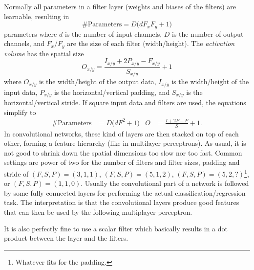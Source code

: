 	Normally all parameters in a filter layer (weights and biases of the filters) are learnable, resulting in
	\begin{equation}
		\text{\#Parameters} = D \big( d F_x F_y + 1 \big)
	\end{equation}
	parameters where \(d\) is the number of input channels, \(D\) is the number of output channels, and \(F_x\)/\(F_y\) are the size of each filter (width/height). The \emph{activation volume} has the spatial size
	\begin{equation}
		O_{x/y} = \frac{I_{x/y} + 2 P_{x/y} - F_{x/y}}{S_{x/y}} + 1
	\end{equation}
	where \(O_{x/y}\) is the width/height of the output data, \(I_{x/y}\) is the width/height of the input data, \(P_{x/y}\) is the horizontal/vertical padding, and \(S_{x/y}\) is the horizontal/vertical stride. If square input data and filters are used, the equations simplify to
	\begin{align}
		\text{\#Parameters} & = D \big( d F^2 + 1 \big)    &
		O                   & = \frac{I + 2 P - F}{S} + 1.
	\end{align}
	In convolutional networks, these kind of layers are then stacked on top of each other, forming a feature hierarchy (like in multilayer perceptrons). As usual, it is not good to shrink down the spatial dimensions too slow nor too fast. Common settings are power of two for the number of filters and filter sizes, padding and stride of \( (F, S, P) = (3, 1, 1) \), \( (F, S, P) = (5, 1, 2) \), \( (F, S, P) = (5, 2, ?) \)\footnote{Whatever fits for the padding.}, or \( (F, S, P) = (1, 1, 0) \). Usually the convolutional part of a network is followed by some fully connected layers for performing the actual classification/regression task. The interpretation is that the convolutional layers produce good features that can then be used by the following multiplayer perceptron.

	It is also perfectly fine to use a scalar filter which basically results in a dot product between the layer and the filters.


